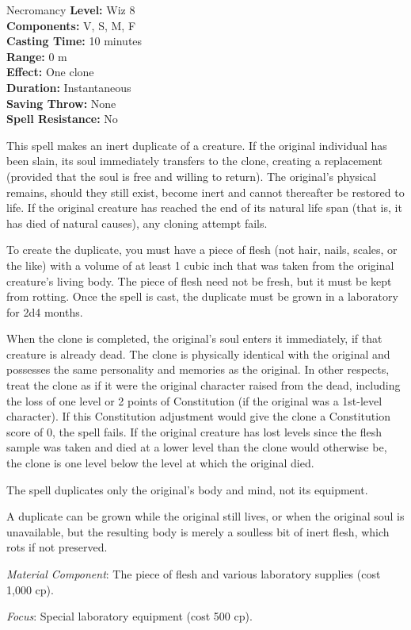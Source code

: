 {Necromancy}
{
	\textbf{Level:}
	Wiz 8\\
	\textbf{Components:}
	V, S, M, F\\
	\textbf{Casting Time:}
	10 minutes\\
	\textbf{Range:}
	0 m\\
	\textbf{Effect:}
	One clone\\
	\textbf{Duration:}
	Instantaneous\\
	\textbf{Saving Throw:}
	None\\
	\textbf{Spell Resistance:}
	No\\
}
{
	This spell makes an inert duplicate of a creature. If the original individual has been slain, its soul immediately transfers to the clone, creating a replacement (provided that the soul is free and willing to return). The original's physical remains, should they still exist, become inert and cannot thereafter be restored to life. If the original creature has reached the end of its natural life span (that is, it has died of natural causes), any cloning attempt fails.

	To create the duplicate, you must have a piece of flesh (not hair, nails, scales, or the like) with a volume of at least 1 cubic inch that was taken from the original creature's living body. The piece of flesh need not be fresh, but it must be kept from rotting. Once the spell is cast, the duplicate must be grown in a laboratory for 2d4 months.

	When the clone is completed, the original's soul enters it immediately, if that creature is already dead. The clone is physically identical with the original and possesses the same personality and memories as the original. In other respects, treat the clone as if it were the original character raised from the dead, including the loss of one level or 2 points of Constitution (if the original was a 1st-level character). If this Constitution adjustment would give the clone a Constitution score of 0, the spell fails. If the original creature has lost levels since the flesh sample was taken and died at a lower level than the clone would otherwise be, the clone is one level below the level at which the original died.

	The spell duplicates only the original's body and mind, not its equipment.

	A duplicate can be grown while the original still lives, or when the original soul is unavailable, but the resulting body is merely a soulless bit of inert flesh, which rots if not preserved.

	\textit{Material Component}:
	The piece of flesh and various laboratory supplies (cost 1,000 cp).

	\textit{Focus}:
	Special laboratory equipment (cost 500 cp).

}
